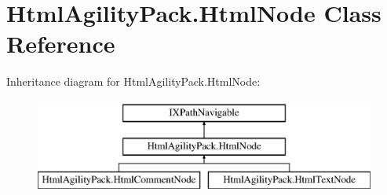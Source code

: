 \hypertarget{class_html_agility_pack_1_1_html_node}{}\section{Html\+Agility\+Pack.\+Html\+Node Class Reference}
\label{class_html_agility_pack_1_1_html_node}
Inheritance diagram for Html\+Agility\+Pack.\+Html\+Node\+:\begin{figure}[H]
\begin{center}
\leavevmode
\includegraphics[height=3.000000cm]{class_html_agility_pack_1_1_html_node}
\end{center}
\end{figure}
